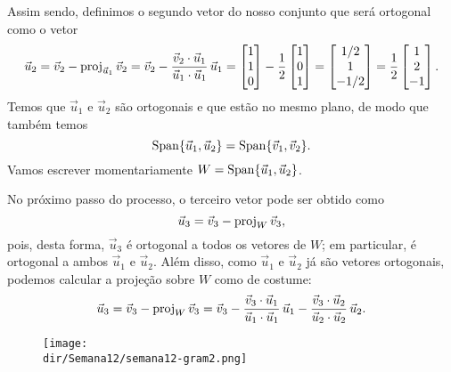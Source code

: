 \documentclass[../livro.tex]{subfiles}  %
\providecommand{\dir}{..}
\begin{document}
\begin{example}
\noindent Assim sendo, definimos o segundo vetor do nosso conjunto que será ortogonal como o vetor
\begin{equation}
\vec{u}_2 = \vec{v}_2 - \operatorname{proj}_{\vec{u}_1} \vec{v}_2 = \vec{v}_2 - \frac{\vec{v}_2 \cdot \vec{u}_1}{\vec{u}_1 \cdot \vec{u}_1} \, \vec{u}_1 =
\begin{bmatrix}
1 \\ 1 \\ 0
\end{bmatrix}
- \frac{1}{2}
\begin{bmatrix}
1 \\ 0 \\ 1
\end{bmatrix} =
\begin{bmatrix}
1/2 \\ 1 \\ -1/2
\end{bmatrix} = \frac{1}{2}
\begin{bmatrix}
1 \\ 2 \\ -1
\end{bmatrix}.
\end{equation} Temos que $\vec{u}_1$ e $\vec{u}_2$ são ortogonais e que estão no mesmo plano, de modo que também temos
\begin{equation}
\operatorname{Span} \{ \vec{u}_1, \vec{u}_2 \} = \operatorname{Span} \{ \vec{v}_1, \vec{v}_2 \}.
\end{equation} Vamos escrever momentariamente $W = \operatorname{Span} \{ \vec{u}_1, \vec{u}_2 \}$.

No próximo passo do processo, o terceiro vetor pode ser obtido como
\begin{equation}
\vec{u}_3 = \vec{v}_3 - \operatorname{proj}_{W} \vec{v}_3,
\end{equation} pois, desta forma, $\vec{u}_3$ é ortogonal a todos os vetores de $W$; em particular, é ortogonal a ambos $\vec{u}_1$ e $\vec{u}_2$. Além disso, como $\vec{u}_1$ e $\vec{u}_2$ já são vetores ortogonais, podemos calcular a projeção sobre $W$ como de costume:
\begin{equation}
\vec{u}_3 = \vec{v}_3 - \operatorname{proj}_{W} \vec{v}_3 = \vec{v}_3 - \frac{\vec{v}_3 \cdot \vec{u}_1}{\vec{u}_1 \cdot \vec{u}_1} \, \vec{u}_1 - \frac{\vec{v}_3 \cdot \vec{u}_2}{\vec{u}_2 \cdot \vec{u}_2} \, \vec{u}_2.
\end{equation}
\begin{figure}[h!]
\begin{center}
\texttt{[image: \\dir/Semana12/semana12-gram2.png]}
\end{center}
\end{figure}


\end{example}
\end{document}
